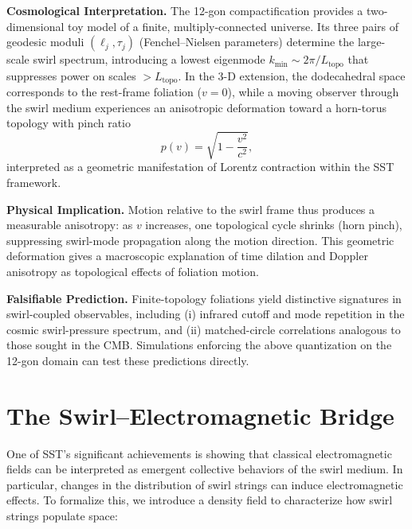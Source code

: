 \documentclass[10pt,reprint,aps,onecolumn,nofootinbib]{revtex4-2}
\begin{document}
    \vspace{0.5em}
    \noindent
    \textbf{Cosmological Interpretation.}
    The 12-gon compactification provides a two-dimensional toy model of a finite,
    multiply-connected universe.  Its three pairs of geodesic moduli $(\ell_j,\tau_j)$
    (Fenchel–Nielsen parameters) determine the large-scale swirl spectrum, introducing a
    lowest eigenmode $k_{\min}\!\sim\!2\pi/L_{\text{topo}}$ that suppresses power on scales
    $>\!L_{\text{topo}}$.  In the 3-D extension, the dodecahedral space corresponds to the
    rest-frame foliation ($v\!=\!0$), while a moving observer through the swirl medium
    experiences an anisotropic deformation toward a horn-torus topology with
    pinch ratio
    \begin{equation}
    p(v)=\sqrt{1-\frac{v^2}{c^2}},
    \end{equation}
    interpreted as a geometric manifestation of Lorentz contraction within the SST
    framework.

    \vspace{0.5em}
    \noindent
    \textbf{Physical Implication.}
    Motion relative to the swirl frame thus produces a measurable anisotropy:
    as $v$ increases, one topological cycle shrinks (horn pinch), suppressing
    swirl-mode propagation along the motion direction.
    This geometric deformation gives a macroscopic explanation of time dilation and
    Doppler anisotropy as topological effects of foliation motion.

    \vspace{0.5em}
    \noindent
    \textbf{Falsifiable Prediction.}
    Finite-topology foliations yield distinctive signatures in swirl-coupled observables,
    including (i) infrared cutoff and mode repetition in the cosmic swirl-pressure spectrum,
    and (ii) matched-circle correlations analogous to those sought in the CMB.
    Simulations enforcing the above quantization on the 12-gon domain can test these
    predictions directly.




	\section{The Swirl–Electromagnetic Bridge}
	One of SST’s significant achievements is showing that classical electromagnetic fields can be interpreted as emergent collective behaviors of the swirl medium. In particular, changes in the distribution of swirl strings can induce electromagnetic effects. To formalize this, we introduce a density field to characterize how swirl strings populate space:
\end{document}
